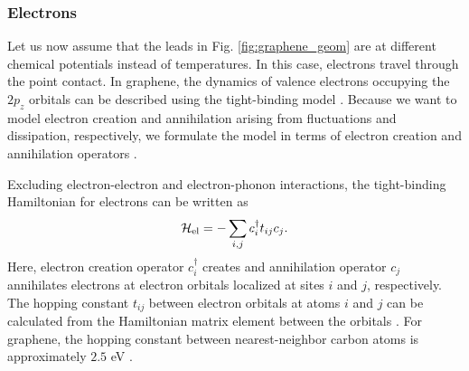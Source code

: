 

\subsubsection{Electrons}

Let us now assume that the leads in Fig. \ref{fig:graphene_geom} are at different chemical potentials instead of temperatures. In this case, electrons travel through the point contact. In graphene, the dynamics of valence electrons occupying the $2p_z$ orbitals can be described using the tight-binding model \cite{wallace47}. Because we want to model electron creation and annihilation arising from fluctuations and dissipation, respectively, we formulate the model in terms of electron creation and annihilation operators \cite{ballentine}. 

Excluding electron-electron and electron-phonon interactions, the tight-binding Hamiltonian for electrons can be written as \cite{datta}
\begin{equation}
 \mathcal{H}_{\textrm{el}} = - \sum_{i,j} c_i^{\dagger} t_{ij} c_j.
\end{equation}
Here, electron creation operator $c_i^{\dagger}$ creates and annihilation operator $c_j$ annihilates electrons at electron orbitals localized at sites $i$ and $j$, respectively. The hopping constant $t_{ij}$ between electron orbitals at atoms $i$ and $j$ can be calculated from the Hamiltonian matrix element between the orbitals \cite{}. For graphene, the hopping constant between nearest-neighbor carbon atoms is approximately $2.5$ eV \cite{dassarma11}.

